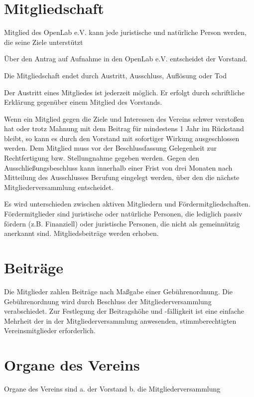 \documentclass[a5paper, ngerman, 10pt]{scrreprt}
\begin{document}
\section{Mitgliedschaft}
\begin{compactenum}[(1)]
    \item Mitglied des OpenLab e.V. kann jede juristische und natürliche Person
        werden, die seine Ziele unterstützt
    \item Über den Antrag auf Aufnahme in den OpenLab e.V. entscheidet der
        Vorstand.
    \item Die Mitgliedschaft endet durch Austritt, Ausschluss, Auflösung oder
        Tod
    \item Der Austritt eines Mitgliedes ist jederzeit möglich. Er erfolgt durch
        schriftliche Erklärung gegenüber einem Mitglied des Vorstands.
    \item Wenn ein Mitglied gegen die Ziele und Interessen des Vereins schwer
        verstoßen hat oder trotz Mahnung mit dem Beitrag für mindestens 1 Jahr
        im Rückstand bleibt, so kann es durch den Vorstand mit sofortiger
        Wirkung ausgeschlossen werden. Dem Mitglied muss vor der
        Beschlussfassung Gelegenheit zur Rechtfertigung bzw. Stellungnahme
        gegeben werden. Gegen den Ausschließungsbeschluss kann innerhalb einer
        Frist von drei Monaten nach Mitteilung des Ausschlusses Berufung
        eingelegt werden, über den die nächste Mitgliederversammlung
        entscheidet.
    \item Es wird unterschieden zwischen aktiven Mitgliedern und
        Fördermitgliedschaften.  Fördermitglieder sind juristische oder
        natürliche Personen, die lediglich passiv fördern (z.B. Finanziell)
        oder juristische Personen, die nicht als gemeinnützig anerkannt sind.
        Mitgliedsbeiträge werden erhoben.
\end{compactenum}


\section{Beiträge}
Die Mitglieder zahlen Beiträge nach Maßgabe einer Gebührenordnung. Die
Gebührenordnung wird durch Beschluss der Mitgliederversammlung verabschiedet.
Zur Festlegung der Beitragshöhe und -fälligkeit ist eine einfache Mehrheit der
in der Mitgliederversammlung anwesenden, stimmberechtigten Vereinsmitglieder
erforderlich.


\section{Organe des Vereins}
Organe des Vereins sind a. der Vorstand b. die Mitgliederversammlung
\end{document}
